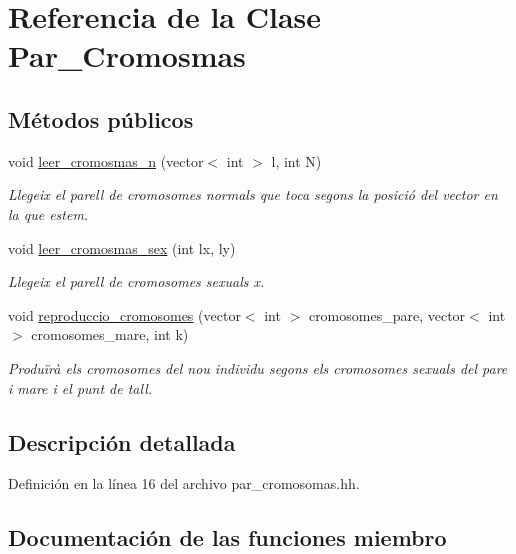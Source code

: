 \hypertarget{class_par___cromosmas}{}\section{Referencia de la Clase Par\+\_\+\+Cromosmas}
\label{class_par___cromosmas}
\subsection*{Métodos públicos}
\begin{DoxyCompactItemize}
\item 
void \hyperlink{class_par___cromosmas_a60fb703c5cbe7efb659bb416a363113c}{leer\+\_\+cromosmas\+\_\+n} (vector$<$ int $>$ l, int N)
\begin{DoxyCompactList}\small\item\em Llegeix el parell de cromosomes normals que toca segons la posició del vector en la que estem. \end{DoxyCompactList}\item 
void \hyperlink{class_par___cromosmas_a7857ea8f3ec852de93fac2f0963ceee1}{leer\+\_\+cromosmas\+\_\+sex} (int lx, ly)
\begin{DoxyCompactList}\small\item\em Llegeix el parell de cromosomes sexuals x. \end{DoxyCompactList}\item 
void \hyperlink{class_par___cromosmas_ad3a3c1e5cbcc3007862c0cb857647725}{reproduccio\+\_\+cromosomes} (vector$<$ int $>$ cromosomes\+\_\+pare, vector$<$ int $>$ cromosomes\+\_\+mare, int k)
\begin{DoxyCompactList}\small\item\em Produïrà els cromosomes del nou individu segons els cromosomes sexuals del pare i mare i el punt de tall. \end{DoxyCompactList}\end{DoxyCompactItemize}


\subsection{Descripción detallada}


Definición en la línea 16 del archivo par\+\_\+cromosomas.\+hh.



\subsection{Documentación de las funciones miembro}
\hypertarget{class_par___cromosmas_a60fb703c5cbe7efb659bb416a363113c}{}
